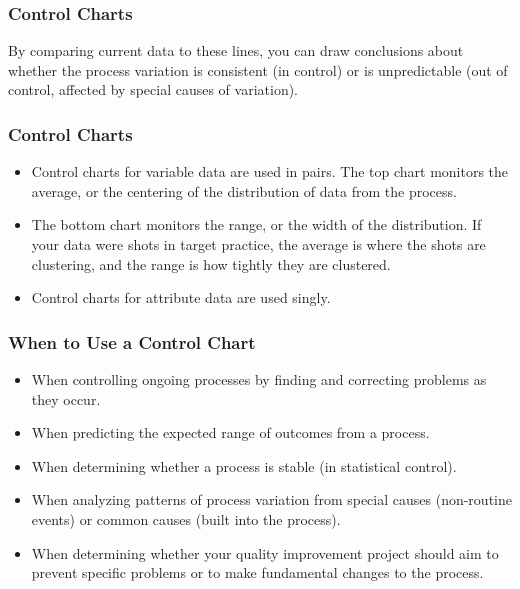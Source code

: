 \documentclass{beamer}
\begin{document}
\begin{frame}
\frametitle{Control Charts}
By comparing current data to these lines, you can draw conclusions about whether the process variation is consistent (in control) or is unpredictable (out of control, affected by special causes of variation).
\end{frame}
\begin{frame}
\frametitle{Control Charts}
\begin{itemize}
\item Control charts for variable data are used in pairs. The top chart monitors the average, or the centering of the distribution of data from the process. 
\item The bottom chart monitors the range, or the width of the distribution. If your data were shots in target practice, the average is where the shots are clustering, and the range is how tightly they are clustered. 
\item Control charts for attribute data are used singly.
\end{itemize}

\end{frame}
\begin{frame}
\frametitle{When to Use a Control Chart}

\begin{itemize} 
\item When controlling ongoing processes by finding and correcting problems as they occur.
\item When predicting the expected range of outcomes from a process.
\item When determining whether a process is stable (in statistical control).
\item When analyzing patterns of process variation from special causes (non-routine events) or common causes (built into the process).
\item When determining whether your quality improvement project should aim to prevent specific problems or to make fundamental changes to the process.
\end{itemize}
\end{frame}
\end{document}
